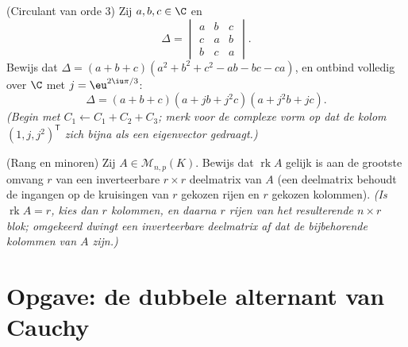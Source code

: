 \begin{exercise}[$\star\star$]\label{exo:b1:det:11}
(Circulant van orde $3$) Zij $a, b, c \in \C$ en
\[
\Delta = \begin{vmatrix}
a & b & c\\
c & a & b\\
b & c & a
\end{vmatrix}.
\]
Bewijs dat $\Delta = (a + b + c)(a^2 + b^2 + c^2 - ab - bc - ca)$,
en ontbind volledig over $\C$ met $j = \eu^{2\iu\pi/3}$:
\[
\Delta = (a + b + c)(a + jb + j^2c)(a + j^2b + jc) .
\]
\emph{(Begin met $C_1 \leftarrow C_1 + C_2 + C_3$; merk voor de
complexe vorm op dat de kolom $(1, j, j^2)^{\mathsf T}$ zich bijna
als een eigenvector gedraagt.)}
\end{exercise}

\begin{exercise}[$\star\star\star$]\label{exo:b1:det:12}
(Rang en minoren) Zij $A \in \mathcal{M}_{n,p}(K)$. Bewijs dat
$\operatorname{rk} A$ gelijk is aan de grootste omvang $r$ van een
inverteerbare $r \times r$ deelmatrix van $A$ (een deelmatrix
behoudt de ingangen op de kruisingen van $r$ gekozen rijen en $r$
gekozen kolommen). \emph{(Is $\operatorname{rk} A = r$, kies dan $r$
 kolommen, en daarna $r$  rijen van het resulterende $n
\times r$ blok; omgekeerd dwingt een inverteerbare deelmatrix af
dat de bijbehorende kolommen van $A$  zijn.)}
\end{exercise}

\section{Opgave: de dubbele alternant van Cauchy}

